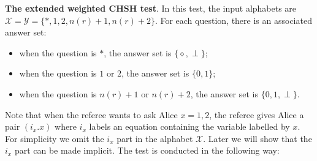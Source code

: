 \documentclass[11pt,letterpaper]{article}
\newcommand{\calX}{\mathcal{X}}
\newcommand{\calY}{\mathcal{Y}}
\newcommand{\1}{\mathbb{1}}
\newcommand{\nr}{n(r)}
\theoremstyle{definition}
\begin{document}
\textbf{The extended weighted CHSH test}.
In this test, 
the input alphabets are $\calX = \calY = \{\ast, 1, 2, \nr+1,\nr+2\}$.
For each question, there is an associated answer set:
\begin{itemize}
	\item when the question is $\ast$, the answer set is $\{\diamond, \perp\}$;
	\item when the question is $1$ or $2$, the answer set is $\{0,1\}$;
	\item when the question is $\nr+1$ or $\nr+2$, the answer set is $\{0, 1, \perp\}$.
\end{itemize}
Note that when the referee wants to ask Alice $x = 1,2$, the referee gives Alice a pair $(i_x. x)$ where 
$i_x$ labels an equation containing the variable labelled by $x$. 
For simplicity we omit the $i_x$ part in the alphabet $\calX$.
Later we will show that the $i_x$ part can be made implicit.
The test is conducted in the following way:
\end{document}
